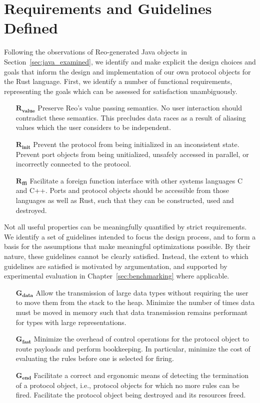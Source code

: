 \section{Requirements and Guidelines Defined}
\label{sec:requirements_defined}
Following the observations of Reo-generated Java objects in Section~\ref{sec:java_examined}, we identify and make explicit the design choices and goals that inform the design and implementation of our own protocol objects for the Rust language. 
First, we identify a number of functional requirements, representing the goals which can be assessed for satisfaction unambiguously.


\begin{enumerate}
	\item[$\boldsymbol{R_{value}}$] Preserve Reo's value passing semantics. No user interaction should contradict these semantics. This precludes data races as a result of aliasing values which the user considers to be independent.
	
	\item[$\boldsymbol{R_{init}}$] Prevent the protocol from being initialized in an inconsistent state. Prevent port objects from being unitialized, unsafely accessed in parallel, or incorrectly connected to the protocol.
	
	\item[$\boldsymbol{R_{ffi}}$] Facilitate a foreign function interface with other systems languages C and C++. Ports and protocol objects should be accessible from those languages as well as Rust, such that they can be constructed, used and destroyed.
\end{enumerate}

Not all useful properties can be meaningfully quantified by strict requirements. We identify a set of guidelines intended to focus the design process, and to form a basis for the assumptions that make meaningful optimizations possible. By their nature, these guidelines cannot be clearly satisfied. Instead, the extent to which guidelines are satisfied is motivated by argumentation, and supported by experimental evaluation in Chapter~\ref{sec:benchmarking} where applicable.

\begin{enumerate}
	\item[$\boldsymbol{G_{data}}$] Allow the transmission of large data types without requiring the user to move them from the stack to the heap. Minimize the number of times data must be moved in memory such that data transmission remains performant for types with large representations.	
	
	\item[$\boldsymbol{G_{fast}}$] Minimize the overhead of control operations for the protocol object to route payloads and perform bookkeeping. In particular, minimize the cost of evaluating the rules before one is selected for firing.
	
	\item[$\boldsymbol{G_{end}}$] Facilitate a correct and ergonomic means of detecting the termination of a protocol object, i.e., protocol objects for which no more rules can be fired. Facilitate the protocol object being destroyed and its resources freed. 
\end{enumerate}


